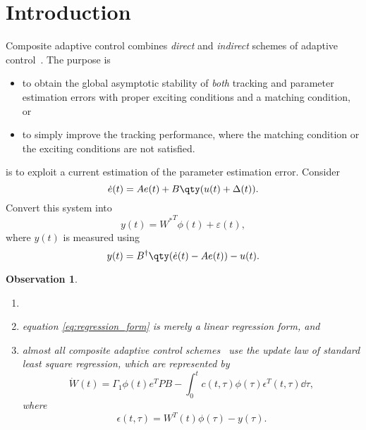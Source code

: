 \documentclass[nobib]{my-handout}
\date{August 21, 2018}
\newtheorem{observation}{Observation}
\begin{document}
\maketitle


\section{Introduction}

Composite adaptive control combines \textit{direct} and
\textit{indirect} schemes of adaptive
control~\cite{lavretsky_combined/composite_2009}. The purpose is
\begin{itemize}
	\item to obtain the global asymptotic stability of \textit{both} tracking
		and parameter estimation errors with proper exciting conditions and a
		matching condition, or
	\item to simply improve the tracking performance, where the matching condition
		or the exciting conditions are not satisfied.
\end{itemize}

 is to exploit a current estimation of the
parameter estimation error. Consider
\begin{equation*}
	\dot{e}(t) = A e(t) + B \qty(u(t) + \Delta(t)).
\end{equation*}
Convert this system into
\begin{equation}\label{eq:regression_form}
	y(t) = {W^\ast}^T \phi(t) + \varepsilon(t),
\end{equation}
where $y(t)$ is measured using
\begin{equation*}
	y(t) = B^\dagger \qty(\dot{e}(t) - Ae(t)) - u(t).
\end{equation*}

\begin{observation}
	\begin{enumerate}
		\item[]
		\item equation \eqref{eq:regression_form} is merely a linear regression form,
			and
		\item almost all composite adaptive control
			schemes~\cite{lavretsky_combined/composite_2009, cho_composite_2018,
			chowdhary_exponential_2014} use the update law of standard least square
			regression, which are represented by
			\begin{equation}\label{eq:general_form_of_composite_update_law}
				\dot{W}(t) = \Gamma_1 \phi(t) e^T P B - \int_0^t c(t, \tau) \phi(\tau)
				\epsilon^T(t, \tau) \dd{\tau},
			\end{equation}
			where
			\begin{equation*}
				\epsilon(t, \tau) = W^T(t) \phi(\tau) - y(\tau).
			\end{equation*}
	\end{enumerate}
\end{observation}
\end{document}
